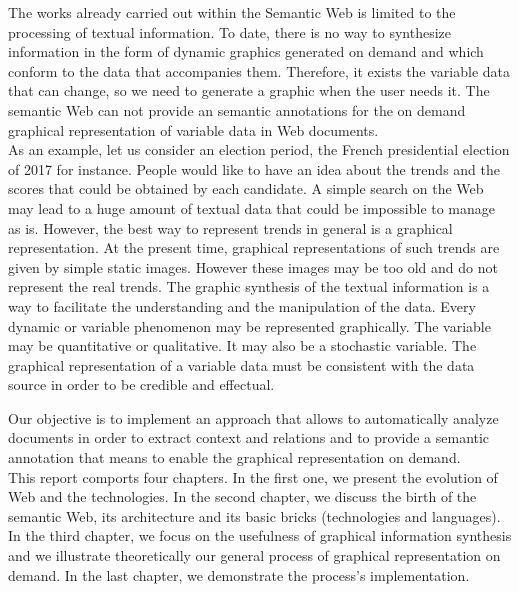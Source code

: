 The works already carried out within the Semantic Web is limited to the processing of textual information. To date, there is no way to synthesize information in the form of dynamic graphics generated on demand and which conform to the data that accompanies them. Therefore, it exists the variable data that can change, so we need to generate a graphic when the user needs it. The semantic Web can not provide an semantic annotations for the on demand graphical representation of variable data in Web documents. \\ 

As an example, let us consider an election period, the French presidential election of 2017 for instance. People would like to have an idea about the trends and the scores that could be obtained by each candidate. A simple search on the Web may lead to a huge amount of textual data that could be impossible to manage as is. However, the best way to represent trends in general is a graphical representation.
At the present time, graphical representations of such trends are given by simple static images. However these images may be too old and do not represent the real trends. The graphic synthesis of the textual information is a way to facilitate the understanding and the manipulation of the data. Every dynamic or variable phenomenon may be represented graphically. The variable may be quantitative or qualitative. It may also be a stochastic variable. The graphical representation of a variable data must be consistent with the data source in order to be credible and effectual.

Our objective is to implement an approach that allows to automatically analyze documents in order to  extract context and relations and to provide a semantic annotation that means to enable the graphical representation on demand. \\


This report comports four chapters. In the first one, we present the evolution of Web and the technologies. In the second chapter, we discuss the birth of the semantic Web, its architecture and its basic bricks (technologies and languages). In the third chapter, we focus on the usefulness of graphical information synthesis and we illustrate theoretically our general process of graphical representation on demand. In the last chapter, we demonstrate the process's implementation. \\




